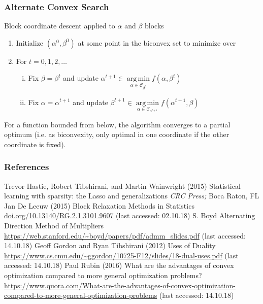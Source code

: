 \documentclass{beamer}
\DeclareMathOperator*{\argmin}{arg\,min}
\begin{document}
\begin{frame}
\frametitle{Alternate Convex Search}

Block coordinate descent applied to $\alpha$ and $\beta$ blocks
\begin{enumerate}
\item Initialize $(\alpha^0,\beta^0)$ at some point in the biconvex set to minimize over
\item For $t=0,1,2,\dots$
	\begin{enumerate}[(i)]
	\item Fix $\beta=\beta^t$ and update $\alpha^{t+1}\in\argmin\limits_{\alpha\in\mathcal{C}_{\beta^t}}f(\alpha,\beta^t)$
	\item Fix $\alpha=\alpha^{t+1}$ and update $\beta^{t+1}\in\argmin\limits_{\alpha\in\mathcal{C}_{\alpha^{t+1}}}f(\alpha^{t+1},\beta)$
	\end{enumerate}
\end{enumerate}
\vspace{10pt}

For a function bounded from below, the algorithm converges to a partial optimum (i.e. as biconvexity, only optimal in one coordinate if the other coordinate is fixed).
\end{frame}

\begin{frame}[allowframebreaks]
\frametitle{References}
\footnotesize{
\begin{thebibliography}{99} %
 Trevor Hastie, Robert Tibshirani, and Martin Wainwright (2015)
\newblock Statistical learning with sparsity: the Lasso and
generalizations
\newblock \emph{CRC Press;} Boca Raton, FL%
 Jan De Leeuw (2015)
\newblock Block Relaxation Methods in Statistics
\newblock \url{doi.org/10.13140/RG.2.1.3101.9607} (last accessed: 02.10.18)
 S. Boyd 
\newblock Alternating Direction Method of Multipliers
\newblock \url{https://web.stanford.edu/~boyd/papers/pdf/admm_slides.pdf} (last accessed: 14.10.18)
 Geoff Gordon and Ryan Tibshirani (2012)
\newblock Uses of Duality
\newblock \url{https://www.cs.cmu.edu/~ggordon/10725-F12/slides/18-dual-uses.pdf} (last accessed: 14.10.18) 
 Paul Rubin (2016)
\newblock What are the advantages of convex optimization compared to more general optimization problems?
\newblock \url{https://www.quora.com/What-are-the-advantages-of-convex-optimization-compared-to-more-general-optimization-problems} (last accessed: 14.10.18) 
\end{thebibliography}
}
\end{frame}
\end{document}
